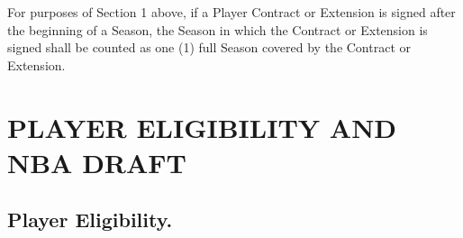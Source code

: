 \documentclass[
]{book}
\begin{document}
For purposes of Section 1 above, if a Player Contract or Extension is signed after the beginning of a Season, the Season in which the Contract or Extension is signed shall be counted as one (1) full Season covered by the Contract or Extension.

\hypertarget{player-eligibility-and-nba-draft}{%
\chapter{PLAYER ELIGIBILITY AND NBA DRAFT}\label{player-eligibility-and-nba-draft}}

\hypertarget{player-eligibility.}{%
\section{Player Eligibility.}\label{player-eligibility.}}
\end{document}
